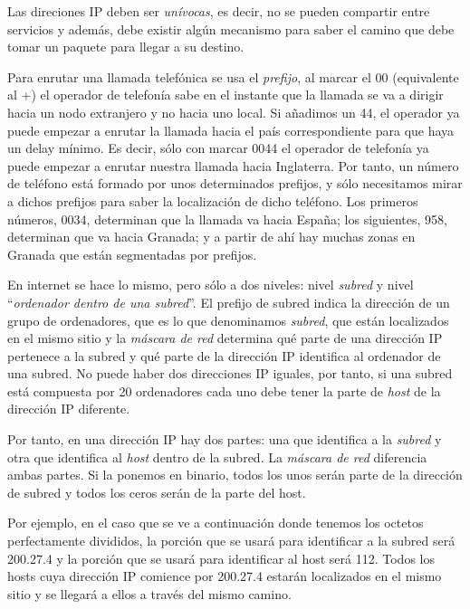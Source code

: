 \documentclass[10pt,a4paper,spanish]{report}
\begin{document}
Las direciones IP deben ser \textit{\textcolor{tema4}{unívocas}}, es decir, no se pueden compartir entre servicios y además, debe existir algún mecanismo para saber el camino que debe tomar un paquete para llegar a su destino.

Para enrutar una llamada telefónica se usa el \textit{\textcolor{tema4}{prefijo}}, al marcar el 00 (equivalente al +) el operador de telefonía sabe en el instante que la llamada se va a dirigir hacia un nodo extranjero y no hacia uno local. Si añadimos un 44, el operador ya puede empezar a enrutar la llamada hacia el país correspondiente para que haya un delay mínimo. Es decir, sólo con marcar 0044 el operador de telefonía ya puede empezar  a enrutar nuestra llamada hacia Inglaterra. Por tanto, un número de teléfono está formado por unos determinados prefijos, y sólo necesitamos mirar a dichos prefijos para saber la localización de dicho teléfono. Los primeros números, 0034, determinan que la llamada va hacia España; los siguientes, 958, determinan que va hacia Granada; y a partir de ahí hay muchas zonas en Granada que están segmentadas por prefijos.

En internet se hace lo mismo, pero sólo a dos niveles: nivel \textit{\textcolor{tema4}{subred}} y nivel ``\textit{\textcolor{tema4}{ordenador dentro de una subred}}''. El prefijo de subred indica la dirección de un grupo de ordenadores, que es lo que denominamos \textit{\textcolor{tema4}{subred}}, que están localizados en el mismo sitio y la \textit{\textcolor{tema4}{máscara de red}} determina qué parte de una dirección IP pertenece a la subred y qué parte de la dirección IP identifica al ordenador de una subred. No puede haber dos direcciones IP iguales, por tanto, si una subred está compuesta por 20 ordenadores cada uno debe tener la parte de \textit{\textcolor{tema4}{host}} de la dirección IP diferente.

Por tanto, en una dirección IP hay dos partes: una que identifica a la \textit{\textcolor{tema4}{subred}} y otra que identifica al \textit{\textcolor{tema4}{host}} dentro de la subred. La \textit{\textcolor{tema4}{máscara de red}} diferencia ambas partes. Si la ponemos en binario, todos los unos serán parte de la dirección de subred y todos los ceros serán de la parte del host. 

Por ejemplo, en el caso que se ve a continuación donde tenemos los octetos perfectamente divididos, la porción que se usará para identificar a la subred será 200.27.4 y la porción que se usará para identificar al host será 112. Todos los hosts cuya dirección IP comience por 200.27.4 estarán localizados en el mismo sitio y se llegará a ellos a través del mismo camino.
\end{document}
